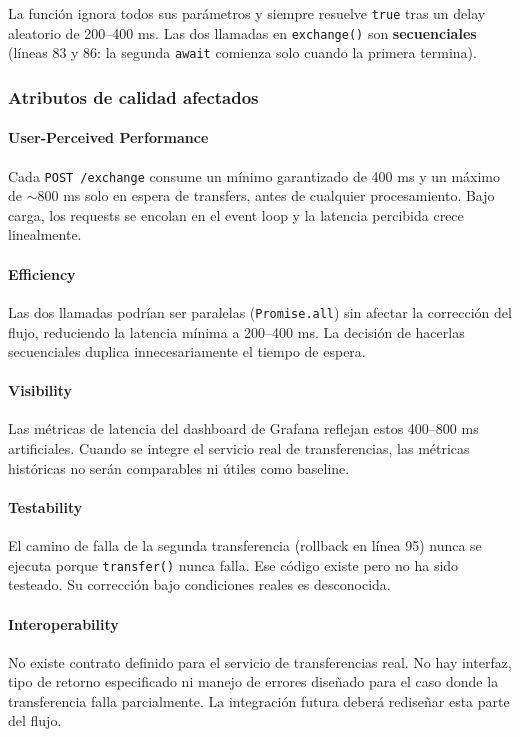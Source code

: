 La función ignora todos sus parámetros y siempre resuelve \texttt{true} tras un delay aleatorio de 200–400 ms. Las dos llamadas en \texttt{exchange()} son \textbf{secuenciales} (líneas 83 y 86: la segunda \texttt{await} comienza solo cuando la primera termina).

\subsubsection{Atributos de calidad afectados}

\paragraph{User-Perceived Performance}
Cada \texttt{POST /exchange} consume un mínimo garantizado de 400 ms y un máximo de \(\sim\)800 ms solo en espera de transfers, antes de cualquier procesamiento. Bajo carga, los requests se encolan en el event loop y la latencia percibida crece linealmente.

\paragraph{Efficiency}
Las dos llamadas podrían ser paralelas (\texttt{Promise.all}) sin afectar la corrección del flujo, reduciendo la latencia mínima a 200–400 ms. La decisión de hacerlas secuenciales duplica innecesariamente el tiempo de espera.

\paragraph{Visibility}
Las métricas de latencia del dashboard de Grafana reflejan estos 400–800 ms artificiales. Cuando se integre el servicio real de transferencias, las métricas históricas no serán comparables ni útiles como baseline.

\paragraph{Testability}
El camino de falla de la segunda transferencia (rollback en línea 95) nunca se ejecuta porque \texttt{transfer()} nunca falla. Ese código existe pero no ha sido testeado. Su corrección bajo condiciones reales es desconocida.

\paragraph{Interoperability}
No existe contrato definido para el servicio de transferencias real. No hay interfaz, tipo de retorno especificado ni manejo de errores diseñado para el caso donde la transferencia falla parcialmente. La integración futura deberá rediseñar esta parte del flujo.

